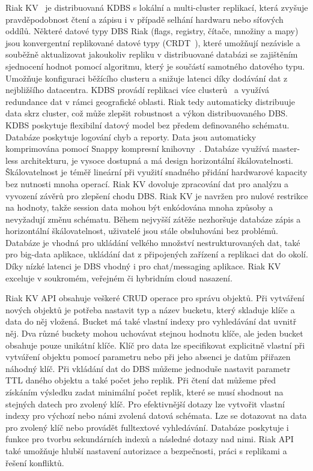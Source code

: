 \documentclass[czech,master,dept460,male,csharp,cpdeclaration]{diploma}
\begin{document}
	Riak KV~\cite{riak} je distribuovaná KDBS s lokální a multi-cluster replikací, která zvyšuje pravděpodobnost čtení a zápisu i v případě selhání hardwaru nebo síťových oddílů. Některé datové typy DBS Riak (flags, registry, čítače, množiny a mapy) jsou konvergentní replikované datové typy (CRDT~\cite{crdt, riakkv-crdt}), které umožňují nezávisle a souběžně aktualizovat jakoukoliv repliku v distribuované databázi se zajištěním sjednocení hodnot pomocí algoritmu, který je součástí samotného datového typu. Umožňuje konfiguraci běžícího clusteru a snižuje latenci díky dodávání dat z nejbližšího datacentra. KDBS provádí replikaci více clusterů~\cite{multicluster, riakkv-multiclustr} a využívá redundance dat v rámci geografické oblasti. Riak tedy automaticky distribuuje data skrz cluster, což může zlepšit robustnost a výkon distribuovaného DBS. KDBS poskytuje flexibilní datový model bez předem definovaného schématu. Databáze poskytuje logování chyb a reporty. Data jsou automaticky komprimována pomocí Snappy kompresní knihovny~\cite{snappy}. Databáze využívá master-less architekturu, je vysoce dostupná a má design horizontální škálovatelnosti. Škálovatelnost je téměř lineární při využití snadného přidání hardwarové kapacity bez nutnosti mnoha operací. Riak KV dovoluje zpracování dat pro analýzu a vyvození závěrů pro zlepšení chodu DBS. Riak KV je navržen pro nulové restrikce na hodnoty, takže session data mohou být enkódována mnoha způsoby a nevyžadují změnu schématu. Během nejvyšší zátěže nezhoršuje databáze zápis a horizontální škálovatelnost, uživatelé jsou stále obsluhováni bez problémů. Databáze je vhodná pro ukládání velkého množství nestrukturovaných dat, také pro big-data aplikace, ukládání dat z připojených zařízení a replikaci dat do okolí. Díky nízké latenci je DBS vhodný i pro chat/messaging aplikace. Riak KV exceluje v soukromém, veřejném či hybridním cloud nasazení.
	
	Riak KV API obsahuje veškeré CRUD operace pro správu objektů. Při vytváření nových objektů je potřeba nastavit typ a název bucketu, který skladuje klíče a data do něj vložená. Bucket má také vlastní indexy pro vyhledávání dat uvnitř něj. Dva různé buckety mohou uchovávat stejnou hodnotu klíče, ale jeden bucket obsahuje pouze unikátní klíče. Klíč pro data lze specifikovat explicitně vlastní při vytváření objektu pomocí parametru nebo při jeho absenci je datům přiřazen náhodný klíč. Při vkládání dat do DBS můžeme jednoduše nastavit parametr TTL daného objektu a také počet jeho replik. Při čtení dat můžeme před získáním výsledku zadat minimální počet replik, které se musí shodnout na stejných datech pro zvolený klíč. Pro efektivnější dotazy lze vytvořit vlastní indexy pro výchozí nebo námi zvolená datová schémata. Lze se dotazovat na data pro zvolený klíč nebo provádět fulltextové vyhledávání. Databáze poskytuje i funkce pro tvorbu sekundárních indexů a následné dotazy nad nimi. Riak API také umožňuje hlubší nastavení autorizace a bezpečnosti, práci s replikami a řešení konfliktů.
	
\end{document}
